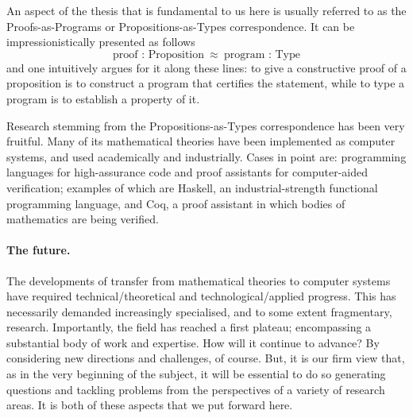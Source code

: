 \documentclass[11pt,twocolumn]{article}
\newenvironment{myitemize}
  {\begin{list}{$\bullet$}
  {\setlength{\topsep}{1pt}
   \setlength{\partopsep}{1pt}
   \setlength{\itemsep}{0pt}
   \setlength{\parsep}{0pt}
   \setlength{\leftmargin}{1em}
   \setlength{\labelwidth}{.5em}}}
  {\end{list}}
\newcommand{\eg}{\emph{eg.}}
\begin{document}
An aspect of the thesis that is fundamental to us here is usually referred
to as the Proofs-as-Programs or Propositions-as-Types correspondence.
It can be impressionistically %
presented %
as follows
\[%
%
  \mbox{proof : Proposition} 
  \enspace \approx \enspace 
  \mbox{program : Type} 
\]
and one intuitively argues for it along these lines: %
  to give a constructive proof of a proposition 
  is to construct a program that certifies the statement, 
  while
  to type a program is to establish a property of it.

Research stemming from the Propositions-as-Types correspondence has been
very fruitful.  Many of its mathematical theories have been implemented as
computer systems, and used academically and industrially.  Cases in point
are: programming languages for high-assurance code and proof assistants
for computer-aided verification; examples of which are
Haskell, %
an industrial-strength functional programming language, 
and Coq, %
a proof assistant in which bodies of mathematics are being verified.

\paragraph*{The future.}

The developments of transfer from mathematical theories to computer
systems have required technical/theoretical and technological/applied
progress.  This has necessarily demanded increasingly specialised, and to
some extent fragmentary, research.  
Importantly, %
the field has reached a first plateau; encompassing a substantial body of
work and expertise.  
How %
will it continue to advance?  
By considering new directions and challenges, of course.  
But, 
it is our firm view that,
as in the very beginning of the subject, 
it will be essential to do so generating questions and tackling problems
from the perspectives of a variety of research areas.  
It is both of these aspects that we put forward here.
\end{document}
